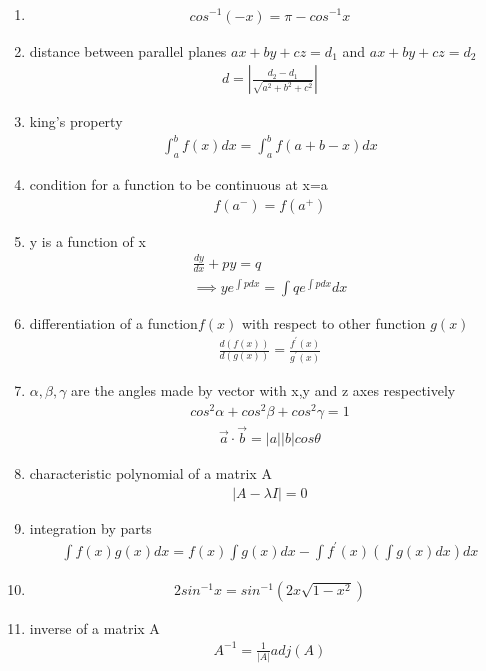 \begin{enumerate}[label=\thesubsection.\arabic*, ref=\thesubsection.\theenumi]
\item 
\begin{align}
    cos^{-1}(-x)=\pi - cos^{-1}x \label{eq:ee26btech11222-prob 8_2}
\end{align}
 \item distance between parallel planes $ax+by+cz=d_1$ and $ax+by+cz=d_2$
 \begin{align}
     d=\left | \frac{d_2-d_1}{\sqrt{a^2+b^2+c^2}}\right | \label{eq:ee26btech11222-prob 13}
 \end{align}
 \item king's property
 \begin{align}
     \int_a^b f(x)dx= \int_a^b f(a+b-x)dx \label{eq:ee26btech11222-prob 14}
 \end{align}
 \item condition for a function to be continuous at x=a
 \begin{align}
     f(a^-)=f(a^+) \label{eq:ee26btech11222-prob 16}
 \end{align}
 \item y is a function of x
 \begin{align}
     \frac{dy}{dx}+py=q \\ \implies ye^{\int pdx}= \int q  e^{\int pdx}dx \label{eq:ee26btech11222-prob 17}
 \end{align} 
 \item differentiation of a function$f(x)$ with respect to other function $g(x)$
 \begin{align}
     \frac{d(f(x))}{d(g(x))}=\frac{f^\prime (x)}{g^\prime (x)} \label{eq:ee26btech11222-prob 20}
 \end{align}
 \item $\alpha ,\beta, \gamma $ are the angles made by vector with x,y and z axes respectively 
 \begin{align} 
     cos^2\alpha+ cos^2\beta+cos^2\gamma=1 \label{eq:ee26btech11222-prob 19}
 \end{align}
 \begin{align}
 	\vec{a}\cdot\vec{b}=\vert{a}\vert{}\vert{}b\vert{}cos\theta \label{eq:ee26btech11222-prob-19_2}
 \end{align}
 \item characteristic polynomial of a matrix A
 \begin{align}
    |A-\lambda I|=0 \label{eq:ee26btech11222-prob 22} 
 \end{align}
 \item integration by parts 
 \begin{align}
     \int f(x)g(x)dx=f(x)\int g(x)dx-\int f^\prime (x)\left(\int g(x)dx\right) dx \label{eq:ee26btech11222-prob 21}
 \end{align}
 \item 
 \begin{align}
 	2sin^{-1}x= sin^{-1}(2x\sqrt{1-x^2}) \label{eq:ee26btech11222-prob-27}
 \end{align}
 \item inverse of a matrix A
 \begin{align}
     A^{-1}= \frac{1}{\vert{}A\vert{}}adj(A) \label{eq:ee26btech11222-prob-34 }
 \end{align}


\end{enumerate}
